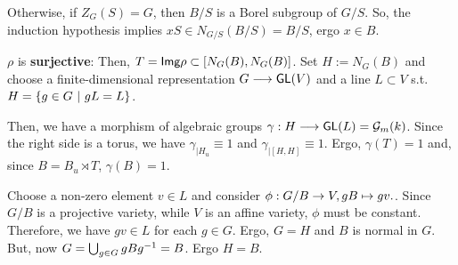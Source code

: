		Otherwise, if $Z_G(S) = G$, then $B/S$ is a Borel subgroup of $G/S$. So, the induction hypothesis implies
		$ xS \in N_{G/S} (B/S) = B/S$,
		ergo $x \in B$.
		
$\rho$ is \textbf{surjective}:
		Then,
		$ T = \textsf{Img} \rho \subset [N_G(B), N_G(B)]$.
		Set $H := N_G(B)$ and
		choose a finite-dimensional representation
		$ G \overset{}{\longrightarrow} \textsf{GL}(V)$
		and a line $L \subset V$ s.t.
		$H = \left\lbrace g \in G ~ | ~ gL = L\right\rbrace$.
		
		Then, we have a morphism of algebraic groups
		$ \gamma : H \overset{}{\longrightarrow} \textsf{GL}(L) = \mathcal{G}_m(k)$.
		Since the right side is a torus, we have
		$\gamma_{| H_u} \equiv 1$ and $\gamma_{|[H,H]}  \equiv 1$.
		Ergo, $\gamma(T) = 1$ and, since $B = B_u \rtimes T$, $\gamma(B) = 1$.
		
		Choose a non-zero element $v \in L$ and consider $\phi : G/B \overset{}{\rightarrow} V, gB \mapsto gv.$.
		Since $G/B$ is a projective variety, while $V$ is an affine variety, $\phi$ must be constant. Therefore, we have $gv \in L$ for each $g \in G$.
		Ergo, $ G = H$ and $B$ is normal in $G$. But, now
		$ G = \bigcup_{g\in G} gBg^{-1} = B$.
		Ergo $H = B$.
